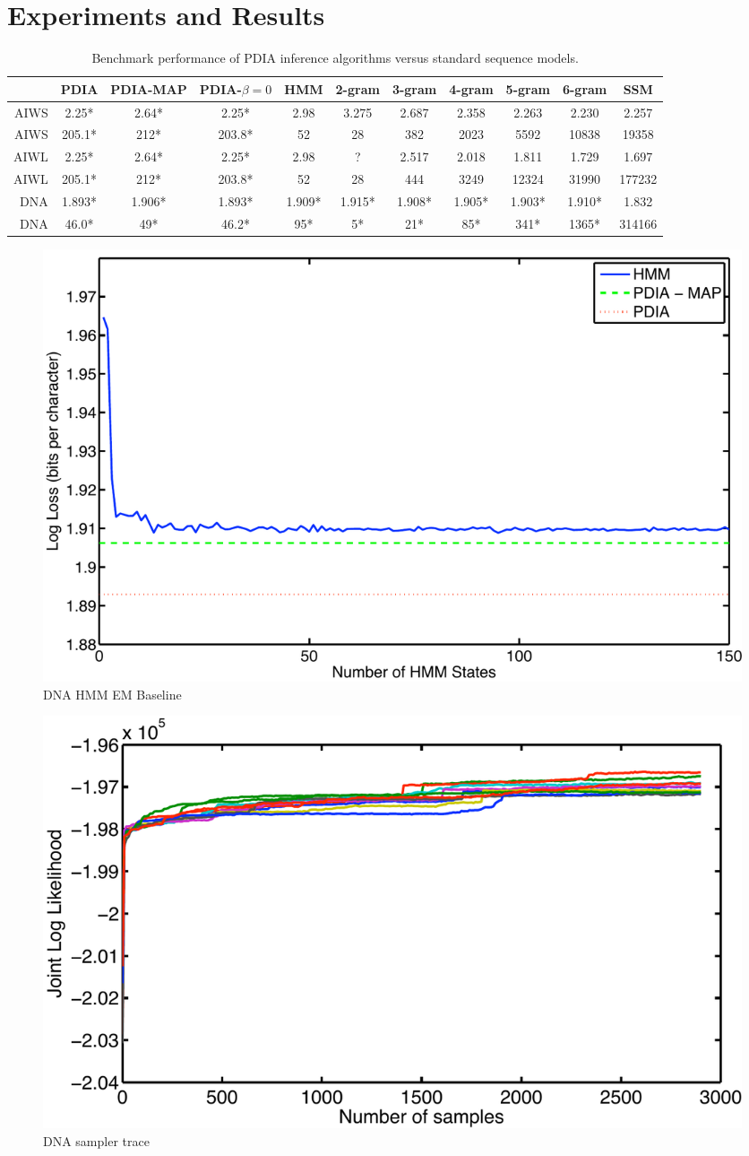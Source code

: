 \section{Experiments and Results}


\begin{table}[t]
    \begin{center}
    \setlength{\tabcolsep}{1.3mm}
\begin{tabular}{r|cccccccccc}
\hline
& {\bf PDIA } & PDIA-MAP & PDIA-$\beta=0$ & HMM & 2-gram& 3-gram & 4-gram & 5-gram & 6-gram & SSM \\
\hline
AIWS & 2.25* & 2.64* & 2.25* & 2.98 & 3.275 & 2.687 & 2.358 & 2.263 & 2.230 & 2.257 \\
AIWS & 205.1* & 212* & 203.8* & 52 & 28 & 382 & 2023 & 5592 & 10838 & 19358 \\
\hline
\hline
AIWL & 2.25* & 2.64* & 2.25* & 2.98 & ? & 2.517 & 2.018 & 1.811 & 1.729 & 1.697 \\
AIWL & 205.1* & 212* & 203.8* & 52 & 28 & 444 & 3249 & 12324 & 31990 & 177232 \\
\hline
\hline
DNA & 1.893* & 1.906* & 1.893* & 1.909* & 1.915* & 1.908* & 1.905* & 1.903* & 1.910* & 1.832 \\
DNA & 46.0* & 49* & 46.2* & 95* & 5* & 21* & 85* & 341* & 1365* & 314166 \\
\hline
\end{tabular}
\end{center}
\caption[Short]{Benchmark performance of PDIA inference algorithms versus standard sequence models.}
\label{table:results}
\end{table}

\begin{figure}[htbp]
\begin{center}
\includegraphics[width=.5\textwidth]{results/dna_hmm}
\caption{DNA HMM EM Baseline}
\label{fig:dna_hmm}
\end{center}
\end{figure}

\begin{figure}[htbp]
\begin{center}
\includegraphics[width=.5\textwidth]{results/dna_sampler}
\caption{DNA sampler trace }
\label{fig:dna_sampler}
\end{center}
\end{figure}

